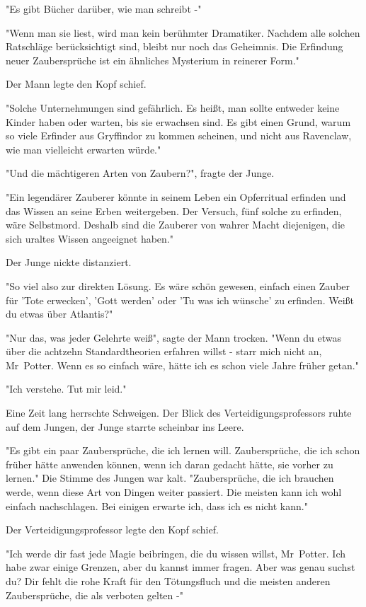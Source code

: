 {"Es gibt Bücher darüber, wie man schreibt -"

"Wenn man sie liest, wird man kein berühmter Dramatiker. Nachdem alle solchen Ratschläge berücksichtigt sind, bleibt nur noch das Geheimnis. Die Erfindung neuer Zaubersprüche ist ein ähnliches Mysterium in reinerer Form."

Der Mann legte den Kopf schief.

"Solche Unternehmungen sind gefährlich. Es heißt, man sollte entweder keine Kinder haben oder warten, bis sie erwachsen sind. Es gibt einen Grund, warum so viele Erfinder aus Gryffindor zu kommen scheinen, und nicht aus Ravenclaw, wie man vielleicht erwarten würde."

"Und die mächtigeren Arten von Zaubern?", fragte der Junge.

"Ein legendärer Zauberer könnte in seinem Leben ein Opferritual erfinden und das Wissen an seine Erben weitergeben. Der Versuch, fünf solche zu erfinden, wäre Selbstmord. Deshalb sind die Zauberer von wahrer Macht diejenigen, die sich uraltes Wissen angeeignet haben."

Der Junge nickte distanziert.

"So viel also zur direkten Lösung. Es wäre schön gewesen, einfach einen Zauber für 'Tote erwecken', 'Gott werden' oder 'Tu was ich wünsche' zu erfinden. Weißt du etwas über Atlantis?"

"Nur das, was jeder Gelehrte weiß", sagte der Mann trocken. "Wenn du etwas über die achtzehn Standardtheorien erfahren willst - starr mich nicht an, Mr~Potter. Wenn es so einfach wäre, hätte ich es schon viele Jahre früher getan."

"Ich verstehe. Tut mir leid."

Eine Zeit lang herrschte Schweigen. Der Blick des Verteidigungsprofessors ruhte auf dem Jungen, der Junge starrte scheinbar ins Leere.

"Es gibt ein paar Zaubersprüche, die ich lernen will. Zaubersprüche, die ich schon früher hätte anwenden können, wenn ich daran gedacht hätte, sie vorher zu lernen." Die Stimme des Jungen war kalt. "Zaubersprüche, die ich brauchen werde, wenn diese Art von Dingen weiter passiert. Die meisten kann ich wohl einfach nachschlagen. Bei einigen erwarte ich, dass ich es nicht kann."

Der Verteidigungsprofessor legte den Kopf schief.

"Ich werde dir fast jede Magie beibringen, die du wissen willst, Mr~Potter. Ich habe zwar einige Grenzen, aber du kannst immer fragen. Aber was genau suchst du? Dir fehlt die rohe Kraft für den Tötungsfluch und die meisten anderen Zaubersprüche, die als verboten gelten -"

}
